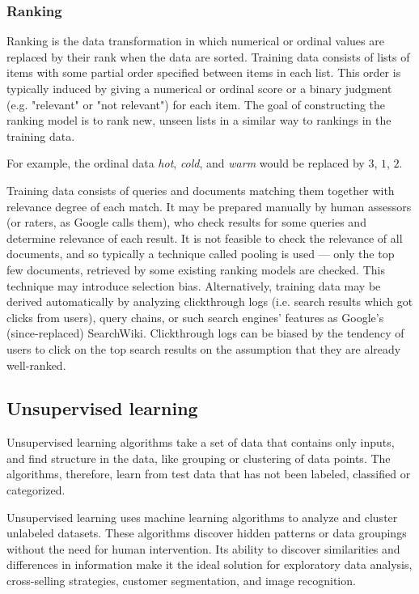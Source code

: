 \subsubsection{Ranking}
Ranking is the data transformation in which numerical or ordinal values are replaced by their rank when the data are sorted.  Training data consists of lists of items with some partial order specified between items in each list. This order is typically induced by giving a numerical or ordinal score or a binary judgment (e.g. "relevant" or "not relevant") for each item. The goal of constructing the ranking model is to rank new, unseen lists in a similar way to rankings in the training data.

For example, the ordinal data \emph{hot}, \emph{cold}, and \emph{warm} would be replaced by \(3\), \(1\), \(2\).

\begin{example}
    Training data consists of queries and documents matching them together with relevance degree of each match. It may be prepared manually by human assessors (or raters, as Google calls them), who check results for some queries and determine relevance of each result. It is not feasible to check the relevance of all documents, and so typically a technique called pooling is used — only the top few documents, retrieved by some existing ranking models are checked. This technique may introduce selection bias. Alternatively, training data may be derived automatically by analyzing clickthrough logs (i.e. search results which got clicks from users), query chains, or such search engines' features as Google's (since-replaced) SearchWiki. Clickthrough logs can be biased by the tendency of users to click on the top search results on the assumption that they are already well-ranked.
\end{example}

\subsection{Unsupervised learning}
Unsupervised learning algorithms take a set of data that contains only inputs, and find structure in the data, like grouping or clustering of data points. The algorithms, therefore, learn from test data that has not been labeled, classified or categorized. 

Unsupervised learning uses machine learning algorithms to analyze and cluster unlabeled datasets. These algorithms discover hidden patterns or data groupings without the need for human intervention. Its ability to discover similarities and differences in information make it the ideal solution for exploratory data analysis, cross-selling strategies, customer segmentation, and image recognition.

